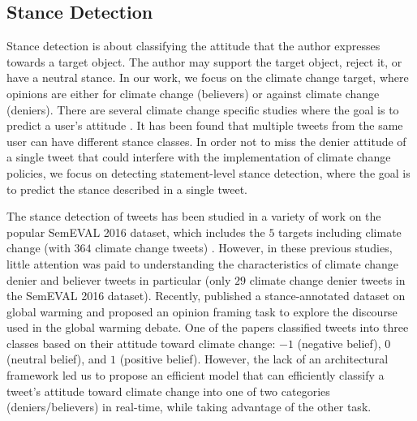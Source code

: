 \documentclass[letterpaper]{article}
\begin{document}
\subsection{Stance Detection}
Stance detection is about classifying the attitude that the author expresses towards a target object. The author may support the target object, reject it, or have a neutral stance. %
In our work, we focus on the climate change target, where opinions are either for climate change (believers) or against climate change (deniers). There are several climate change specific studies where the goal is to predict a user's attitude \cite{chen2019detecting,tyagi2020polarizing}. It has been found that multiple tweets from the same user can have different stance classes. In order not to miss the denier attitude of a single tweet that could interfere with the implementation of climate change policies, we focus on detecting statement-level stance detection, where the goal is to predict the stance described in a single tweet.
\par \noindent The stance detection of tweets has been studied in a variety of work on the popular SemEVAL 2016 dataset, which includes the $5$ targets including climate change (with $364$ climate change tweets) \cite{vychegzhanin2021new,wang2020neural}. However, in these previous studies, little attention was paid to understanding the characteristics of climate change denier and believer tweets in particular (only $29$ climate change denier tweets in the SemEVAL 2016 dataset). Recently, \cite{luo2020detecting} published a stance-annotated dataset on global warming and proposed an opinion framing task to explore the discourse used in the global warming debate. One of the papers \cite{kabaghe66classifying} classified tweets into three classes based on their attitude toward climate change: $-1$ (negative belief), $0$ (neutral belief), and $1$ (positive belief). However, the lack of an architectural framework led us to propose an efficient model that can efficiently classify a tweet's attitude toward climate change into one of two categories (deniers/believers) in real-time, while taking advantage of the other task.
\end{document}
